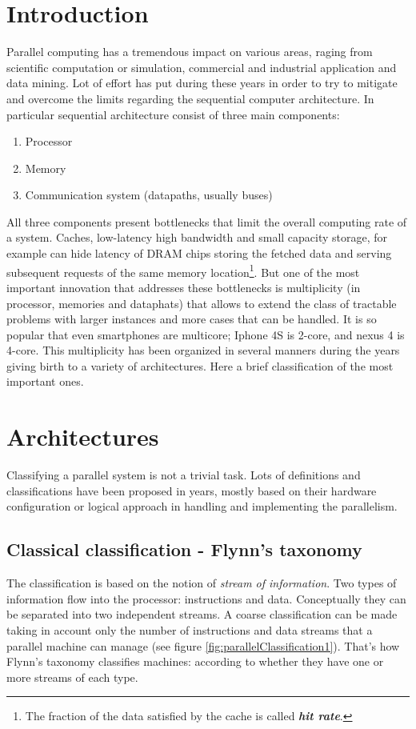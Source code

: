 \section{Introduction}
Parallel computing has a tremendous impact on  various areas, raging from
scientific computation or simulation, commercial and industrial application and
data mining. Lot of effort has put during these years in order to try to
mitigate and overcome the limits regarding the sequential computer architecture.
In particular sequential architecture consist of three main components:
\begin{enumerate}
  \item Processor
  \item Memory
  \item Communication system (datapaths, usually buses)
\end{enumerate}
All three components present bottlenecks that limit the overall computing rate
of a system. Caches, low-latency high bandwidth and small capacity storage, for
example can hide latency of DRAM chips storing the fetched data and serving
subsequent requests of the same memory location\footnote{The fraction of the
data satisfied by the cache is called \textit{\textbf{hit rate}}.}. But one of
the most important innovation that addresses these bottlenecks is multiplicity
(in processor, memories and  dataphats) that allows to extend the class of
tractable problems with larger instances and more cases that can be handled. It
is so popular that even smartphones are multicore; Iphone 4S is 2-core, and nexus 4 is 4-core.
This multiplicity has been organized in several manners during
the years giving birth to a variety of architectures. Here a brief classification of the
most important ones.

\section{Architectures}
Classifying a parallel system is not a trivial task. Lots of definitions and
classifications have been proposed in years, mostly based on their hardware
configuration or logical approach in handling and implementing the parallelism.
\subsection{Classical classification - Flynn's taxonomy}
The classification is based on the notion of  \textit{stream of information}.
Two types of information flow into the processor: instructions and data.
Conceptually they can be separated into two independent streams. A coarse
classification can be made taking in account only the number of instructions and
 data streams that a parallel machine can manage (see figure \ref{fig:parallelClassification1}).
That's how Flynn's taxonomy\cite{Flynn1972} classifies machines: according to
whether they have one or more streams of each type.

